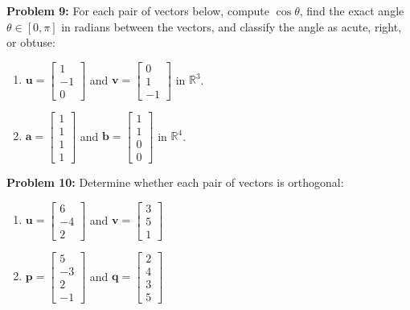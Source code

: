 \documentclass[11pt, letterpaper]{article}
\theoremstyle{definition}
\theoremstyle{remark}
\begin{document}
\textbf{Problem 9:} For each pair of vectors below, compute $\cos\theta$, find the exact angle $\theta \in [0, \pi]$ in radians between the vectors, and classify the angle as acute, right, or obtuse:
\begin{enumerate}[label=(\alph*)]
    \item $\mathbf{u} = \begin{bmatrix} 1 \\ -1 \\ 0 \end{bmatrix}$ and $\mathbf{v} = \begin{bmatrix} 0 \\ 1 \\ -1 \end{bmatrix}$ in $\mathbb{R}^3$.
    \item $\mathbf{a} = \begin{bmatrix} 1 \\ 1 \\ 1 \\ 1 \end{bmatrix}$ and $\mathbf{b} = \begin{bmatrix} 1 \\ 1 \\ 0 \\ 0 \end{bmatrix}$ in $\mathbb{R}^4$.
\end{enumerate}

\textbf{Problem 10:} Determine whether each pair of vectors is orthogonal:
\begin{enumerate}[label=(\alph*)]
    \item $\mathbf{u} = \begin{bmatrix} 6 \\ -4 \\ 2 \end{bmatrix}$ and $\mathbf{v} = \begin{bmatrix} 3 \\ 5 \\ 1 \end{bmatrix}$
    \item $\mathbf{p} = \begin{bmatrix} 5 \\ -3 \\ 2 \\ -1 \end{bmatrix}$ and $\mathbf{q} = \begin{bmatrix} 2 \\ 4 \\ 3 \\ 5 \end{bmatrix}$
\end{enumerate}
\end{document}

